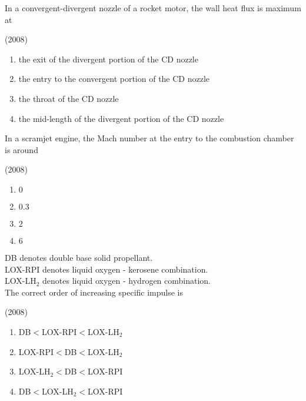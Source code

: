     \item In a convergent-divergent  nozzle of a rocket motor, the wall heat flux is maximum at
    
    \hfill{(2008)}

        \begin{enumerate}
            \item the exit of the divergent portion of the CD nozzle
            \item the entry to the convergent portion of the CD nozzle
            \item the throat of the CD nozzle
            \item the mid-length of the divergent portion of the CD nozzle
        \end{enumerate}

    \item In a scramjet engine, the Mach number at the entry to the combustion chamber is around
    
    \hfill{(2008)}

        \begin{multicols}{4}
            \begin{enumerate}
                \item $0$
                \item $0.3$
                \item $2$
                \item $6$
            \end{enumerate}
        \end{multicols}

    \item DB denotes double base solid propellant.\\
    LOX-RPI denotes liquid oxygen - kerosene combination.\\
    LOX-LH$_2$ denotes liquid oxygen - hydrogen combination.\\

    The correct order of increasing specific impulse is 
    
    \hfill{(2008)}

        \begin{multicols}{2}
            \begin{enumerate}
                \item DB$<$LOX-RPI$<$LOX-LH$_2$
                \item LOX-RPI$<$DB$<$LOX-LH$_2$
                \item LOX-LH$_2<$DB$<$LOX-RPI
                \item DB$<$LOX-LH$_2<$LOX-RPI
            \end{enumerate}
        \end{multicols}

